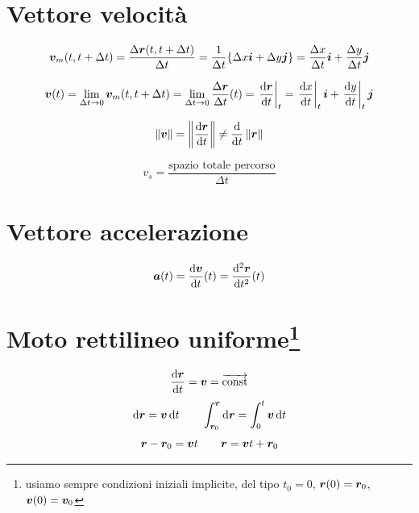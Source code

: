 \section{Vettore velocità}
\begin{Def}
$$\boldsymbol{v}_m(t,t+\Delta t)=\frac{\Delta\boldsymbol{r}(t,t+\Delta t)}{\Delta
t}=\frac{1}{\Delta t}\{\Delta x\boldsymbol{i}+\Delta y\boldsymbol{j}\}=\frac{\Delta x}{\Delta t}\boldsymbol{i}+\frac{\Delta y}{\Delta t}\boldsymbol{j}$$
\end{Def}
\begin{Def}
\begin{equation*}\boldsymbol{v}(t)=\lim_{\Delta t\rightarrow 0}\boldsymbol{v}_m(t,t+\Delta t)=\lim_{\Delta t\rightarrow 0} \frac{\Delta\boldsymbol{r}}{\Delta t}(t)={\left.\frac{\mathrm{d} \boldsymbol{r}}{\mathrm{d} t}\right|_t}=\left.\frac{\mathrm{d} x}{\mathrm{d} t}\right|_t\boldsymbol{i}+\left.\frac{\mathrm{d} y}{\mathrm{d} t}\right|_t\boldsymbol{j}\end{equation*}
\end{Def}
\begin{equation*}\left\lVert\boldsymbol{v}\right\rVert=\left\lVert\frac{\mathrm{d}\boldsymbol{r}}{\mathrm{d} t}\right\rVert\neq\frac{\mathrm{d}}{\mathrm{d} t}\left\lVert\boldsymbol{r}\right\rVert\end{equation*}
\begin{Def}
\begin{equation*}v_s=\frac{\text{spazio totale percorso}}{\Delta t}\end{equation*}
\end{Def}
\section{Vettore accelerazione}
\begin{Def}
\begin{equation*}\boldsymbol{a}(t)=\frac{\mathrm{d} \boldsymbol{v}}{\mathrm{d} t}(t)={\frac{\mathrm{d}^2 \boldsymbol{r}}{\mathrm{d} t^2}}(t)\end{equation*}
\end{Def}
\section[Moto rettilineo uniforme]{Moto rettilineo uniforme\protect\footnote{usiamo sempre condizioni iniziali implicite, del tipo $t_0=0$, $\boldsymbol{r}(0)=\boldsymbol{r}_0$, $\boldsymbol{v}(0)=\boldsymbol{v}_0$}}
\begin{equation*}\frac{\mathrm{d}\boldsymbol{r}}{\mathrm{d} t}=\boldsymbol{v}=\overrightarrow{\text{const}}\end{equation*}
\begin{equation*}\mathrm{d}\boldsymbol{r}=\boldsymbol{v}\,\mathrm{d} t\qquad\int_{\boldsymbol{r}_0}^{\boldsymbol{r}}\mathrm{d}\boldsymbol{r}=\int_0^t\boldsymbol{v}\,\mathrm{d} t\end{equation*}
\begin{equation*}\boldsymbol{r}-\boldsymbol{r}_0=\boldsymbol{v} t\qquad\boldsymbol{r}=\boldsymbol{v} t+\boldsymbol{r}_0\end{equation*}

